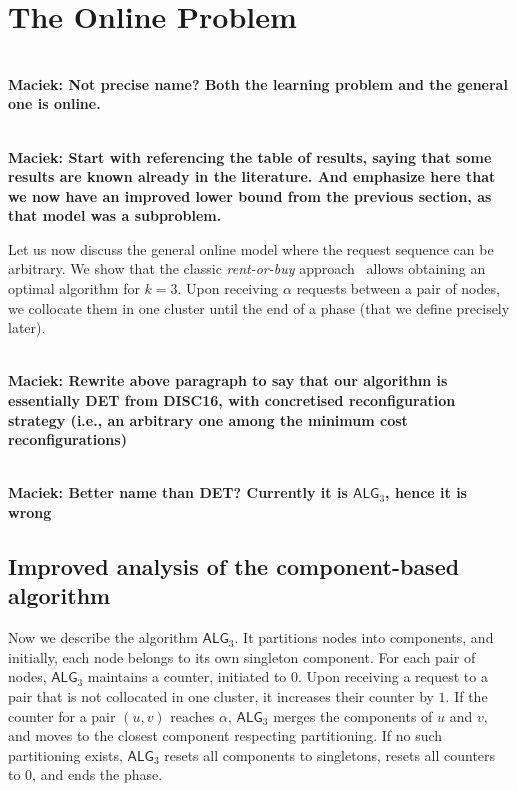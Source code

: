 \documentclass[manuscript,screen=true, review, anonymous]{acmart}
\newcommand{\OPT}{\textsf{OPT}\xspace}
\newcommand{\OBRP}{BRP}
\newcommand{\TAlg}{{\ensuremath{\textsf{ALG}_{3}}}\xspace}
\newcommand\maciek[1]{\color{brown}\textbf{\\ Maciek: #1}\color{black}}
\begin{document}
 
\section{The Online Problem}
\label{sec:k3}


\maciek{Not precise name? Both the learning problem and the general one is online.}

\maciek{Start with referencing the table of results, saying that some results are known already in the literature. And emphasize here that we now have an improved lower bound from the previous section, as that model was a subproblem.}

Let us now discuss the general online
model where the request sequence
can be arbitrary. We show that the classic \emph{rent-or-buy} approach~\cite{karlin-ski-rental} allows obtaining an optimal algorithm for $k=3$.
Upon receiving $\alpha$ requests between a pair of nodes, we collocate them in one cluster until the end of a phase (that we define precisely later).

\maciek{Rewrite above paragraph to say that our algorithm is essentially DET from DISC16, with concretised reconfiguration strategy (i.e., an arbitrary one among the minimum cost reconfigurations)}

\maciek{Better name than DET? Currently it is \TAlg, hence it is wrong}

\subsection{Improved analysis of the component-based algorithm}


Now we describe the algorithm \TAlg.
It partitions nodes into components, and
initially, each node belongs to its own singleton component.
For each pair of nodes, \TAlg maintains a counter, initiated to $0$. 
Upon receiving a request to a pair that is not collocated in one cluster, it increases their counter by $1$.
If the counter for a pair $(u,v)$ reaches $\alpha$, \TAlg merges the components of $u$ and $v$, and moves to the closest component respecting partitioning.
If no such partitioning exists, \TAlg resets all components to singletons, resets all counters to $0$, and ends the phase.
\end{document}
